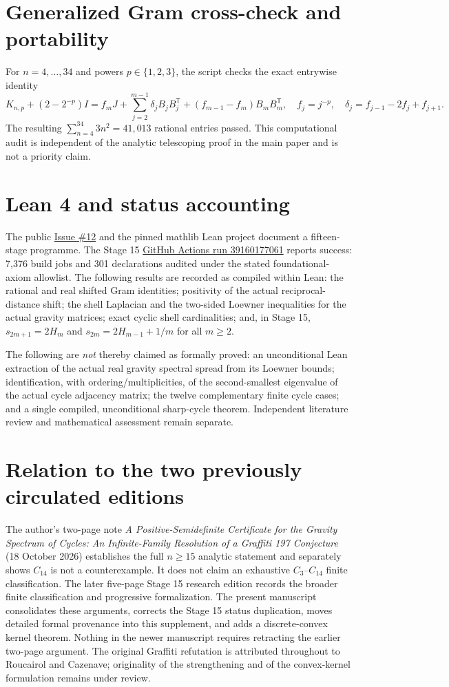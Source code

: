\documentclass[10pt]{article}
\begin{document}
\section{Generalized Gram cross-check and portability}
For $n=4,\ldots,34$ and powers $p\in\{1,2,3\}$, the script checks the exact entrywise identity
\[
K_{n,p}+(2-2^{-p})I=f_mJ+\sum_{j=2}^{m-1}\delta_j B_jB_j^\mathsf{T}
+(f_{m-1}-f_m)B_mB_m^\mathsf{T},
\quad f_j=j^{-p},\quad\delta_j=f_{j-1}-2f_j+f_{j+1}.
\]
The resulting $\sum_{n=4}^{34}3n^2=41{,}013$ rational entries passed. This computational audit is independent of the analytic telescoping proof in the main paper and is not a priority claim.
\section{Lean 4 and status accounting}
The public \href{https://github.com/tonynewton79-web/newton-400-conjectures/issues/12}{Issue \#12} and the pinned mathlib Lean project document a fifteen-stage programme. The Stage 15 \href{https://github.com/tonynewton79-web/newton-400-conjectures/actions/runs/39160177061}{GitHub Actions run 39160177061} reports success: 7,376 build jobs and 301 declarations audited under the stated foundational-axiom allowlist. The following results are recorded as compiled within Lean: the rational and real shifted Gram identities; positivity of the actual reciprocal-distance shift; the shell Laplacian and the two-sided Loewner inequalities for the actual gravity matrices; exact cyclic shell cardinalities; and, in Stage 15, $s_{2m+1}=2H_m$ and $s_{2m}=2H_{m-1}+1/m$ for all $m\ge2$.

The following are \emph{not} thereby claimed as formally proved: an unconditional Lean extraction of the actual real gravity spectral spread from its Loewner bounds; identification, with ordering/multiplicities, of the second-smallest eigenvalue of the actual cycle adjacency matrix; the twelve complementary finite cycle cases; and a single compiled, unconditional sharp-cycle theorem. Independent literature review and mathematical assessment remain separate.
\section{Relation to the two previously circulated editions}
The author's two-page note \emph{A Positive-Semidefinite Certificate for the Gravity Spectrum of Cycles: An Infinite-Family Resolution of a Graffiti 197 Conjecture} (18 October 2026) establishes the full $n\ge15$ analytic statement and separately shows $C_{14}$ is not a counterexample. It does not claim an exhaustive $C_3$--$C_{14}$ finite classification. The later five-page Stage 15 research edition records the broader finite classification and progressive formalization. The present manuscript consolidates these arguments, corrects the Stage 15 status duplication, moves detailed formal provenance into this supplement, and adds a discrete-convex kernel theorem. Nothing in the newer manuscript requires retracting the earlier two-page argument. The original Graffiti refutation is attributed throughout to Roucairol and Cazenave; originality of the strengthening and of the convex-kernel formulation remains under review.
\end{document}
